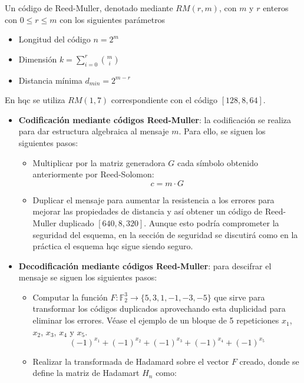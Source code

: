 Un código de Reed-Muller, denotado mediante \(RM(r,m)\), con \(m\) y \(r\) enteros con \(0\le r \le m\) con los siguientes parámetros
\begin{itemize}
	\item Longitud del código \(n=2^m\)
	\item Dimensión \(k=\sum\limits_{i=0}^{r} \displaystyle \binom{m}{i}\)
	\item Distancia mínima \(d_{min}=2^{m-r}\)
\end{itemize}

En \acrshort{hqc} se utiliza $RM(1,7)$ correspondiente con el código $[128,8,64]$.
\begin{itemize}
	\item \textbf{Codificación mediante códigos Reed-Muller}: la codificación se realiza para dar estructura algebraica al mensaje \(m\). Para ello, se siguen los siguientes pasos:
	\begin{itemize}
		\item Multiplicar por la matriz generadora \(G\) cada símbolo obtenido anteriormente por Reed-Solomon:
		\begin{equation}
			c=m\cdot G
		\end{equation}
		\item Duplicar el mensaje para aumentar la resistencia a los errores para mejorar las propiedades de distancia y así obtener un código de Reed-Muller duplicado \([640,8,320]\). Aunque esto podría comprometer la seguridad del esquema, en la sección de seguridad se discutirá como en la práctica el esquema \acrshort{hqc} sigue siendo seguro.
	\end{itemize}
	\item \textbf{Decodificación mediante códigos Reed-Muller}: para descifrar el mensaje se siguen los siguientes pasos:
	\begin{itemize}
		\item Computar la función \(F:\mathbb{F}_2^3\rightarrow\{5,3,1,-1,-3,-5\}\) que sirve para transformar los códigos duplicados aprovechando esta duplicidad para eliminar los errores. Véase el ejemplo de un bloque de 5 repeticiones $x_1$, $x_2$, $x_3$, $x_4$ y $x_5$.
		\begin{equation}
			(-1)^{x_1}+(-1)^{x_2}+(-1)^{x_3}+(-1)^{x_4}+(-1)^{x_5}
		\end{equation}
		\item Realizar la transformada de Hadamard sobre el vector \(F\) creado, donde se define la matriz de Hadamart \(H_n\) como:
		\begin{equation}

\end{equation}
\end{itemize}
\end{itemize}
